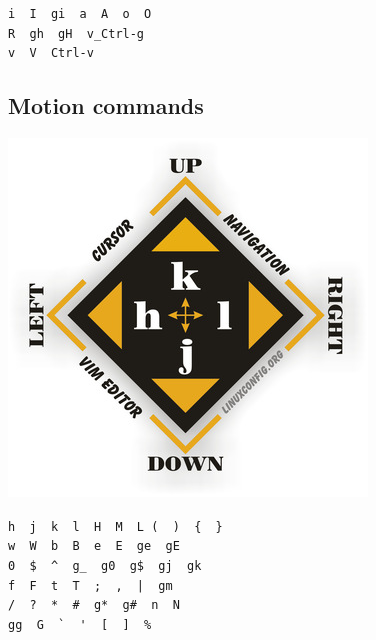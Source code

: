 \documentclass[14pt,svgnames,compress]{beamer}
\newcommand\framesubtitlefontsize{\huge}
\newcommand\singleframesubtitle[1]{
    \begin{center}
        \framesubtitlefontsize #1
    \end{center}
}
\newcommand\subtitleframe{
    \begin{frame}
        \singleframesubtitle{\insertsubsectionhead}
    \end{frame}
}
\begin{document}
\begin{frame}[fragile]
    \begin{spacing}{1.5} %
        \Large
        \centering
        \verb|i  I  gi  a  A  o  O| \\
        \verb|R  gh  gH  v_Ctrl-g| \\
        \verb|v  V  Ctrl-v| \\
    \end{spacing}
\end{frame}


\subsection{Motion commands}

\subtitleframe

\begin{frame}
    \begin{center}
        \includegraphics[scale=1.5]{figures/cursor_motions.jpg}
    \end{center}
\end{frame}

\begin{frame}[fragile]
    \begin{spacing}{1.5} %
        \Large
        \centering
        \verb|h  j  k  l  H  M  L (  )  {  }| \\
        \verb|w  W  b  B  e  E  ge  gE| \\
        \verb|0  $  ^  g_  g0  g$  gj  gk| \\
        \verb+f  F  t  T  ;  ,  |  gm+ \\
        \verb|/  ?  *  #  g*  g#  n  N  | \\
        \verb|gg  G  `  '  [  ]  %|
    \end{spacing}
\end{frame}
\end{document}
